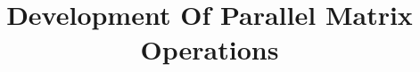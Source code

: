 \documentclass{dependencies/acm_proc_article-sp}
\begin{document}
\title{ Development Of Parallel Matrix Operations }
%
%
%
%
%
\end{document}
